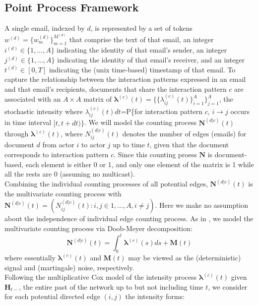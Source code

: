 \documentclass[a4paper]{article}
\begin{document}
\subsection{Point Process Framework}
A single email, indexed by $d$, is represented by a set of tokens $w^{(d)} = \{w^{(d)}_m \}_{m=1}^{M^{(d)}}$ that comprise the
text of that email, an integer $i^{(d)} \in \{1,...,A\}$ indicating the identity of that email’s sender, an integer $j^{(d)} \in \{1,...,A\}$ indicating the identity of that email’s receiver, and an integer $t^{(d)} \in [0, T]$ indicating the (unix time-based) timestamp of that email. To capture the relationship between the interaction patterns expressed in an email and that email’s recipients, documents that share the interaction pattern $c$ are associated with an $A\times A$ matrix of $\boldsymbol{\lambda}^{(c)}(t)=\{\{\lambda^{(c)}_{ij}(t)\}_{i=1}^{A}\}_{j=1}^{A}$, the stochastic intensity where $\lambda^{(c)}_{ij}(t)dt$=P\{for interaction pattern $c$, $i\rightarrow j$ occurs in time interval $[t, t+dt)\}$. We will model the counting process $\mathbf{N}^{(d|c)}(t)$ through $\boldsymbol{\lambda}^{(c)}(t)$, where $N_{ij}^{(d|c)}(t)$ denotes the number of edges (emails) for document $d$ from actor $i$ to actor $j$ up to time $t$, given that the document corresponds to interaction pattern $c$. Since this counting proess $\mathbf{N}$ is document-based, each element is either 0 or 1, and only one element of the matrix is 1 while all the rests are 0 (assuming no multicast). \\ \newline Combining the individual counting processes of all potential edges,  $\mathbf{N}^{(d|c)}(t)$ is the multivariate counting process with $\mathbf{N}^{(d|c)}(t)=(N^{(d|c)}_{ij}(t): i, j \in {1, ..., A}, i \neq j)$. Here we make no assumption about the independence of individual edge counting process. As in \cite{Vu2011}, we model the multivariate counting process via Doob-Meyer decomposition:
\begin{equation}
\mathbf{N}^{(d|c)}(t)=\int_0^t\boldsymbol{\lambda}^{(c)}(s)ds + \mathbf{M}(t)
\end{equation}
where essentially $\boldsymbol{\lambda}^{(c)}(t)$ and $\mathbf{M}(t)$ may be viewed as the (deterministic) signal and (martingale) noise, respectively.\\ \newline
Following the multiplicative Cox model of the intensity process $\boldsymbol{\lambda}^{(c)}(t)$ given $\boldsymbol{H}_{t-}$, the entire past of the network up to but not including time $t$, we consider for each potential directed edge $(i, j)$ the intensity forms:
\end{document}
